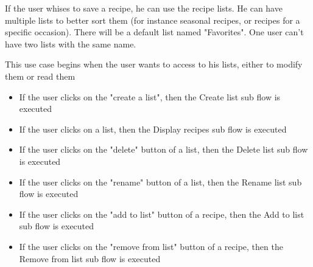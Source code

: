 {
  If the user whises to save a recipe, he can use the recipe lists. He can have multiple lists to better sort them (for instance seasonal recipes, or recipes for a specific occasion). There will be a default list named "Favorites". One user can't have two lists with the same name.

}
{
  This use case begins when the user wants to access to his lists, either to modify them or read them

  \begin{itemize}
    \item If the user clicks on the "create a list", then the Create list sub flow is executed
    \item If the user clicks on a list, then the Display recipes sub flow is executed 
    \item If the user clicks on the "delete" button of a list, then the Delete list sub flow is executed
    \item If the user clicks on the "rename" button of a list, then the Rename list sub flow is executed
    \item If the user clicks on the "add to list" button of a recipe, then the Add to list sub flow is executed
    \item If the user clicks on the "remove from list" button of a recipe, then the Remove from list sub flow is executed
  \end{itemize}
}
